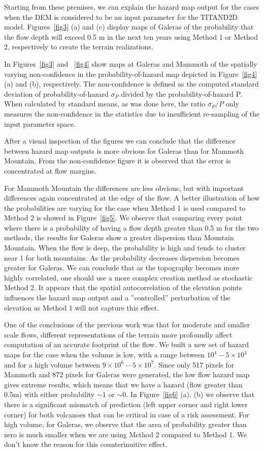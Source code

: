 \documentclass{article}
\begin{document}
Starting from these premises, we can explain the hazard map output for
the cases when the DEM is considered to be an input parameter for the
TITAND2D model.  Figures~\ref{fig3} (a) and (c) display maps of
Galeras of the probability that the flow depth will exceed 0.5 m in
the next ten years using Method 1 or Method 2, respectively to create
the terrain realizations.
 
In Figures~\ref{fig3} and ~\ref{fig4} show maps at Galeras and Mammoth
of the spatially varying non-confidence in the probability-of-hazard
map depicted in Figure~\ref{fig4} (a) and (b), respectively. The
non-confidence is defined as the computed standard deviation of
probability-of-hazard $\sigma_P$ divided by the probability-of-hazard
P.  When calculated by standard means, as was done here, the ratio
$\sigma_P/P$ only measures the non-confidence in the statistics due to
insufficient re-sampling of the input parameter space.

After a visual inspection of the figures we can conclude that the
difference between hazard map outputs is more obvious for Galeras than
for Mammoth Mountain.  From the non-confidence figure it is observed
that the error is concentrated at flow margins.

For Mammoth Mountain the differences are less obvious, but with
important differences again concentrated at the edge of the flow.  A
better illustration of how the probabilities are varying for the case
when Method 1 is used compared to Method 2 is showed in
Figure~\ref{fig5}. We observe that comparing every point where there
is a probability of having a flow depth greater than 0.5 m for the two
methods, the results for Galeras show a greater dispersion than
Mountain Mountain.  When the flow is deep, the probability is high and
tends to cluster near 1 for both mountains.  As the probability
decreases dispersion becomes greater for Galeras.  We can conclude
that as the topography becomes more highly correlated, one should use
a more complex creation method as stochastic Method 2. It appears that
the spatial autocorrelation of the elevation points influences the
hazard map output and a ''controlled'' perturbation of the elevation
as Method 1 will not capture this effect.

One of the conclusions of the previous work was that for moderate and
smaller scale flows, different representations of the terrain more
profoundly affect computation of an accurate footprint of the flow. We
built a new set of hazard maps for the case when the volume is low,
with a range between $10^4 - 5\times 10^4$ and for a high volume
between $9\times 10^6 - 5\times 10^7$.  Since only 517 pixels for
Mammoth and 872 pixels for Galeras were generated, the low flow hazard
map gives extreme results, which means that we have a hazard (flow
greater than 0.5m) with either probability $\sim1$ or $\sim0$.  In
Figure~\ref{fig6} (a), (b) we observe that there is a significant
mismatch of prediction (left upper corner and right lower corner) for
both volcanoes that can be critical in case of a risk assessment.  For
high volume, for Galeras, we observe that the area of probability
greater than zero is much smaller when we are using Method 2 compared
to Method 1. We don't know the reason for this counterinuitive effect.
\end{document}
